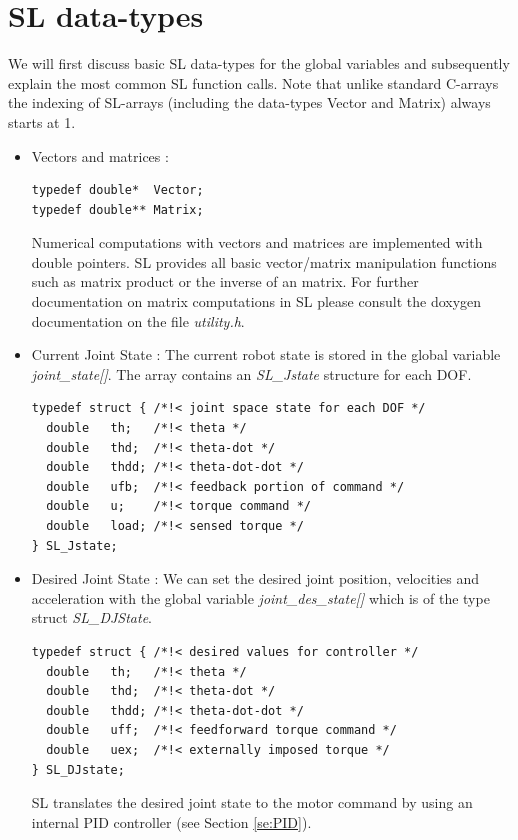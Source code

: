 \documentclass[11pt, article, colorback]{article}
\begin{document}
\section{SL data-types}
 We will first discuss basic SL data-types for the global variables and subsequently explain the most common SL function calls. 
Note that unlike standard C-arrays the indexing of SL-arrays (including the data-types Vector and Matrix) always starts at 1.
\begin{itemize}
 \item Vectors and matrices :
\begin{lstlisting}
typedef double*  Vector;
typedef double** Matrix;
\end{lstlisting}
Numerical computations with vectors and matrices are implemented with double pointers. SL provides all basic vector/matrix manipulation functions such as matrix product or the inverse of an matrix. For further  documentation
on matrix computations in SL please consult the doxygen documentation on the file {\em utility.h}.

\item Current Joint State :
The current robot state is stored in the global variable {\em joint\_state[]}. The array contains an {\em SL\_Jstate } structure for each DOF. 
\begin{lstlisting}
typedef struct { /*!< joint space state for each DOF */
  double   th;   /*!< theta */
  double   thd;  /*!< theta-dot */
  double   thdd; /*!< theta-dot-dot */
  double   ufb;  /*!< feedback portion of command */
  double   u;    /*!< torque command */
  double   load; /*!< sensed torque */
} SL_Jstate;
\end{lstlisting}



\item Desired Joint State :
We can set the desired joint position, velocities and acceleration with the global variable {\em joint\_des\_state[]} which is of the type struct {\em SL\_DJState}.
\begin{lstlisting}
typedef struct { /*!< desired values for controller */
  double   th;   /*!< theta */
  double   thd;  /*!< theta-dot */
  double   thdd; /*!< theta-dot-dot */
  double   uff;  /*!< feedforward torque command */
  double   uex;  /*!< externally imposed torque */
} SL_DJstate;
\end{lstlisting}
SL translates the desired joint state to the motor command by using an internal PID controller (see Section \ref{se:PID}). 


\end{itemize}
\end{document}
